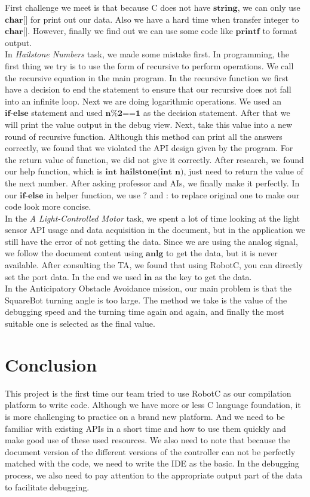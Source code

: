 \documentclass[12pt]{report}
\begin{document}
First challenge we meet is that because C does not have $\mathtt{\textbf{string}}$, we can only use $\mathtt{\textbf{char[]}}$ for print out our data. Also we have a hard time when transfer integer to $\mathtt{\textbf{char[]}}$. However, finally we find out we can use some code like $\mathtt{\textbf{printf}}$ to format output.\\
In \textit{Hailstone Numbers} task, we made some mistake first. In programming, the first thing we try is to use the form of recursive to perform operations. We call the recursive equation in the main program. In the recursive function we first have a decision to end the statement to ensure that our recursive does not fall into an infinite loop. Next we are doing logarithmic operations. We used an $\mathtt{\textbf{if-else}}$ statement and used $\mathtt{\textbf{n\%2==1}}$ as the decision statement. After that we will print the value output in the debug view. Next, take this value into a new round of recursive function. Although this method can print all the answers correctly, we found that we violated the API design given by the program. For the return value of function, we did not give it correctly. After research, we found our help function, which is $\mathtt{\textbf{int}}$ $\mathtt{\textbf{hailstone(int}}$ $\mathtt{\textbf{n)}}$, just need to return the value of the next number. After asking professor and AIs, we finally make it perfectly. In our $\mathtt{\textbf{if-else}}$ in helper function, we use $\mathtt{\textbf{?}}$ and $\mathtt{\textbf{:}}$ to replace original one to make our code look more concise.\\
In the \textit{A Light-Controlled Motor} task, we spent a lot of time looking at the light sensor API usage and data acquisition in the document, but in the application we still have the error of not getting the data. Since we are using the analog signal, we follow the document content using $\mathtt{\textbf{anlg}}$ to get the data, but it is never available. After consulting the TA, we found that using RobotC, you can directly set the port data. In the end we used $\mathtt{\textbf{in}}$ as the key to get the data. \\
In the Anticipatory Obstacle Avoidance mission, our main problem is that the SquareBot turning angle is too large. The method we take is the value of the debugging speed and the turning time again and again, and finally the most suitable one is selected as the final value.

\section{Conclusion}

This project is the first time our team tried to use RobotC as our compilation platform to write code. Although we have more or less C language foundation, it is more challenging to practice on a brand new platform. And we need to be familiar with existing APIs in a short time and how to use them quickly and make good use of these used resources. We also need to note that because the document version of the different versions of the controller can not be perfectly matched with the code, we need to write the IDE as the basic. In the debugging process, we also need to pay attention to the appropriate output part of the data to facilitate debugging.
\end{document}
